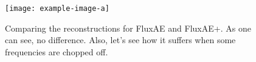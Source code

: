 \begin{figure}
\centering
\texttt{[image: example-image-a]}
\caption{Comparing the reconstructions for FluxAE and FluxAE+\regshortname. As one can see, no difference. Also, let's see how it suffers when some frequencies are chopped off.}
\label{fig:recs-comparison}
\end{figure}
